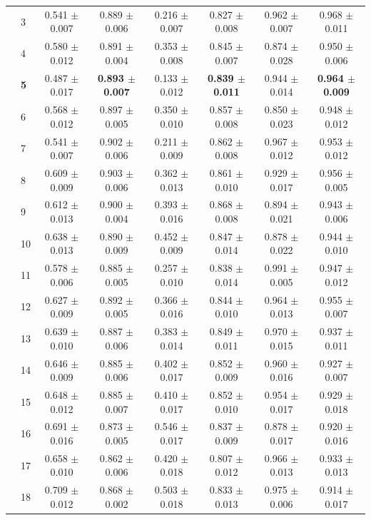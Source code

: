 \begin{longtable}{llcccccc}
 & 3 & 0.541 $\pm$ 0.007 & 0.889 $\pm$ 0.006 & 0.216 $\pm$ 0.007 & 0.827 $\pm$ 0.008 & 0.962 $\pm$ 0.007 & 0.968 $\pm$ 0.011 \\
 & 4 & 0.580 $\pm$ 0.012 & 0.891 $\pm$ 0.004 & 0.353 $\pm$ 0.008 & 0.845 $\pm$ 0.007 & 0.874 $\pm$ 0.028 & 0.950 $\pm$ 0.006 \\
 & \textbf{5} & 0.487 $\pm$ 0.017 & \textbf{0.893 $\pm$ 0.007} & 0.133 $\pm$ 0.012 & \textbf{0.839 $\pm$ 0.011} & 0.944 $\pm$ 0.014 & \textbf{0.964 $\pm$ 0.009} \\
 & 6 & 0.568 $\pm$ 0.012 & 0.897 $\pm$ 0.005 & 0.350 $\pm$ 0.010 & 0.857 $\pm$ 0.008 & 0.850 $\pm$ 0.023 & 0.948 $\pm$ 0.012 \\
 & 7 & 0.541 $\pm$ 0.007 & 0.902 $\pm$ 0.006 & 0.211 $\pm$ 0.009 & 0.862 $\pm$ 0.008 & 0.967 $\pm$ 0.012 & 0.953 $\pm$ 0.012 \\
 & 8 & 0.609 $\pm$ 0.009 & 0.903 $\pm$ 0.006 & 0.362 $\pm$ 0.013 & 0.861 $\pm$ 0.010 & 0.929 $\pm$ 0.017 & 0.956 $\pm$ 0.005 \\
 & 9 & 0.612 $\pm$ 0.013 & 0.900 $\pm$ 0.004 & 0.393 $\pm$ 0.016 & 0.868 $\pm$ 0.008 & 0.894 $\pm$ 0.021 & 0.943 $\pm$ 0.006 \\
 & 10 & 0.638 $\pm$ 0.013 & 0.890 $\pm$ 0.009 & 0.452 $\pm$ 0.009 & 0.847 $\pm$ 0.014 & 0.878 $\pm$ 0.022 & 0.944 $\pm$ 0.010 \\
 & 11 & 0.578 $\pm$ 0.006 & 0.885 $\pm$ 0.005 & 0.257 $\pm$ 0.010 & 0.838 $\pm$ 0.014 & 0.991 $\pm$ 0.005 & 0.947 $\pm$ 0.012 \\
 & 12 & 0.627 $\pm$ 0.009 & 0.892 $\pm$ 0.005 & 0.366 $\pm$ 0.016 & 0.844 $\pm$ 0.010 & 0.964 $\pm$ 0.013 & 0.955 $\pm$ 0.007 \\
 & 13 & 0.639 $\pm$ 0.010 & 0.887 $\pm$ 0.006 & 0.383 $\pm$ 0.014 & 0.849 $\pm$ 0.011 & 0.970 $\pm$ 0.015 & 0.937 $\pm$ 0.011 \\
 & 14 & 0.646 $\pm$ 0.009 & 0.885 $\pm$ 0.006 & 0.402 $\pm$ 0.017 & 0.852 $\pm$ 0.009 & 0.960 $\pm$ 0.016 & 0.927 $\pm$ 0.007 \\
 & 15 & 0.648 $\pm$ 0.012 & 0.885 $\pm$ 0.007 & 0.410 $\pm$ 0.017 & 0.852 $\pm$ 0.010 & 0.954 $\pm$ 0.017 & 0.929 $\pm$ 0.018 \\
 & 16 & 0.691 $\pm$ 0.016 & 0.873 $\pm$ 0.005 & 0.546 $\pm$ 0.017 & 0.837 $\pm$ 0.009 & 0.878 $\pm$ 0.017 & 0.920 $\pm$ 0.016 \\
 & 17 & 0.658 $\pm$ 0.010 & 0.862 $\pm$ 0.006 & 0.420 $\pm$ 0.018 & 0.807 $\pm$ 0.012 & 0.966 $\pm$ 0.013 & 0.933 $\pm$ 0.013 \\
 & 18 & 0.709 $\pm$ 0.012 & 0.868 $\pm$ 0.002 & 0.503 $\pm$ 0.018 & 0.833 $\pm$ 0.013 & 0.975 $\pm$ 0.006 & 0.914 $\pm$ 0.017 \\

\end{longtable}
